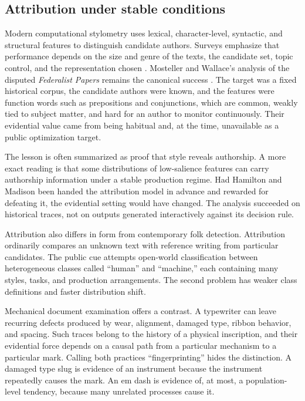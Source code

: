 \documentclass[11pt]{article}
\theoremstyle{plain}
\theoremstyle{definition}
\theoremstyle{remark}
\begin{document}
\subsection{Attribution under stable conditions}

Modern computational stylometry uses lexical, character-level, syntactic, and structural features to distinguish candidate authors. Surveys emphasize that performance depends on the size and genre of the texts, the candidate set, topic control, and the representation chosen \cite{stamatatos2009}. Mosteller and Wallace's analysis of the disputed \emph{Federalist Papers} remains the canonical success \cite{mosteller1963,mosteller1964}. The target was a fixed historical corpus, the candidate authors were known, and the features were function words such as prepositions and conjunctions, which are common, weakly tied to subject matter, and hard for an author to monitor continuously. Their evidential value came from being habitual and, at the time, unavailable as a public optimization target.

The lesson is often summarized as proof that style reveals authorship. A more exact reading is that some distributions of low-salience features can carry authorship information under a stable production regime. Had Hamilton and Madison been handed the attribution model in advance and rewarded for defeating it, the evidential setting would have changed. The analysis succeeded on historical traces, not on outputs generated interactively against its decision rule.

Attribution also differs in form from contemporary folk detection. Attribution ordinarily compares an unknown text with reference writing from particular candidates. The public cue attempts open-world classification between heterogeneous classes called ``human'' and ``machine,'' each containing many styles, tasks, and production arrangements. The second problem has weaker class definitions and faster distribution shift.

Mechanical document examination offers a contrast. A typewriter can leave recurring defects produced by wear, alignment, damaged type, ribbon behavior, and spacing. Such traces belong to the history of a physical inscription, and their evidential force depends on a causal path from a particular mechanism to a particular mark. Calling both practices ``fingerprinting'' hides the distinction. A damaged type slug is evidence of an instrument because the instrument repeatedly causes the mark. An em dash is evidence of, at most, a population-level tendency, because many unrelated processes cause it.
\end{document}
